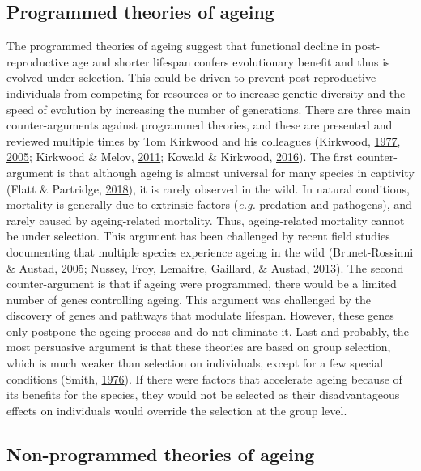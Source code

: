 \documentclass[12pt,twoside]{unicam}
\begin{document}
\hypertarget{introProgAgeing}{%
\subsection{Programmed theories of ageing}\label{introProgAgeing}}

The programmed theories of ageing suggest that functional decline in post-reproductive age and shorter lifespan confers evolutionary benefit and thus is evolved under selection. This could be driven to prevent post-reproductive individuals from competing for resources or to increase genetic diversity and the speed of evolution by increasing the number of generations. There are three main counter-arguments against programmed theories, and these are presented and reviewed multiple times by Tom Kirkwood and his colleagues (Kirkwood, \protect\hyperlink{ref-Kirkwood1977}{1977}, \protect\hyperlink{ref-Kirkwood2005}{2005}; Kirkwood \& Melov, \protect\hyperlink{ref-Kirkwood2011}{2011}; Kowald \& Kirkwood, \protect\hyperlink{ref-Kowald2016}{2016}). The first counter-argument is that although ageing is almost universal for many species in captivity (Flatt \& Partridge, \protect\hyperlink{ref-Flatt2018}{2018}), it is rarely observed in the wild. In natural conditions, mortality is generally due to extrinsic factors (\emph{e.g.} predation and pathogens), and rarely caused by ageing-related mortality. Thus, ageing-related mortality cannot be under selection. This argument has been challenged by recent field studies documenting that multiple species experience ageing in the wild (Brunet-Rossinni \& Austad, \protect\hyperlink{ref-Brunet-Rossinni2005}{2005}; Nussey, Froy, Lemaitre, Gaillard, \& Austad, \protect\hyperlink{ref-Nussey2013}{2013}). The second counter-argument is that if ageing were programmed, there would be a limited number of genes controlling ageing. This argument was challenged by the discovery of genes and pathways that modulate lifespan. However, these genes only postpone the ageing process and do not eliminate it. Last and probably, the most persuasive argument is that these theories are based on group selection, which is much weaker than selection on individuals, except for a few special conditions (Smith, \protect\hyperlink{ref-Smith1976}{1976}). If there were factors that accelerate ageing because of its benefits for the species, they would not be selected as their disadvantageous effects on individuals would override the selection at the group level.

\hypertarget{non-programmed-theories-of-ageing}{%
\subsection{Non-programmed theories of ageing}\label{non-programmed-theories-of-ageing}}
\end{document}
